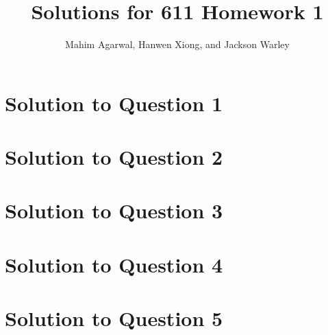 \documentclass[11pt]{article}
\title{Solutions for 611 Homework 1}
\author{Mahim Agarwal, Hanwen Xiong, and Jackson Warley}
\begin{document}
\maketitle

\section{Solution to Question 1}



\section{Solution to Question 2}



\section{Solution to Question 3}



\section{Solution to Question 4}



\section{Solution to Question 5}
\end{document}
